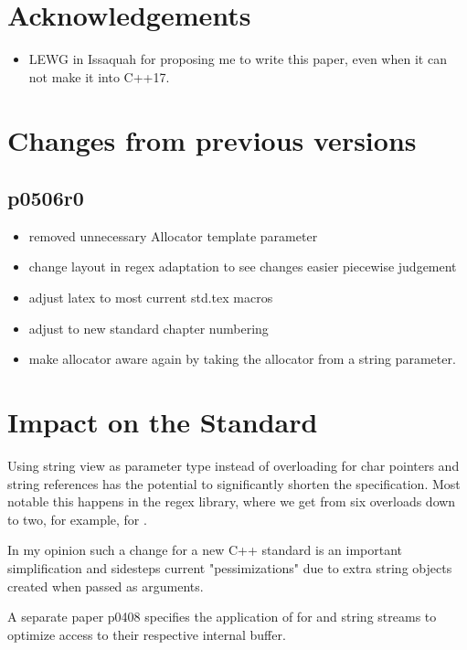 \documentclass[ebook,11pt,article]{memoir}
\begin{document}
\chapter{Acknowledgements}
\begin{itemize}
\item LEWG in Issaquah for proposing me to write this paper, even when it can not make it into C++17.
\end{itemize}

\chapter{Changes from previous versions}

\section{p0506r0} 
\begin{itemize}
\item removed unnecessary Allocator template parameter
\item change layout in regex adaptation to see changes easier piecewise judgement
\item adjust latex to most current std.tex macros
\item adjust to new standard chapter numbering
\item make  allocator aware again by taking the allocator from a string parameter.
\end{itemize}




\chapter{Impact on the Standard}
Using string view as parameter type instead of overloading for char pointers and string references has the potential to significantly shorten the specification. Most notable this happens in the regex library, where we get from six overloads down to two, for example, for .

In my opinion such a change for a new C++ standard is an important simplification and sidesteps current "pessimizations" due to extra string objects created when passed as arguments.

A separate paper p0408 specifies the application of  for  and string streams to optimize access to their respective internal buffer.
\end{document}

